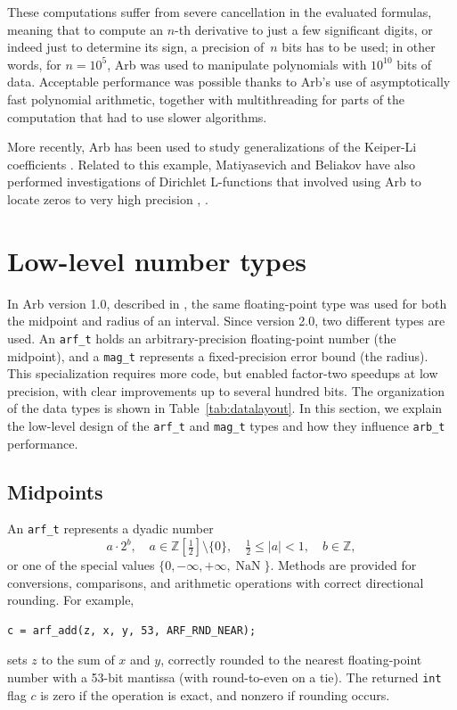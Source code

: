 \documentclass[10pt,journal,compsoc,cspaper]{IEEEtran}
\begin{document}
These computations suffer from severe cancellation in the evaluated formulas,
meaning that to compute an $n$-th derivative to
just a few significant digits, or indeed just to determine its sign,
a precision of~$n$ bits has to be used;
in other words, for $n = 10^5$, Arb was
used to manipulate polynomials with $10^{10}$ bits of data.
Acceptable performance was possible thanks to
Arb's use of asymptotically fast polynomial arithmetic,
together with multithreading for parts of the computation that had
to use slower algorithms.

More recently, Arb has been used to study generalizations
of the Keiper-Li coefficients \cite{bucur2016li}.
Related to this example, Matiyasevich and Beliakov
have also performed investigations of Dirichlet L-functions
that involved using Arb to locate zeros to very high precision
\cite{beliakov2014}, \cite{beliakov2015approximation}.

\section{Low-level number types}
\label{sect:numtypes}

In Arb version 1.0, described in \cite{Johansson2013arb},
the same floating-point type was used for both
the midpoint and radius of an interval.
Since version 2.0, two different types are used.
An \texttt{arf\_t} holds an arbitrary-precision floating-point number (the midpoint),
and a \texttt{mag\_t} represents a fixed-precision error bound (the radius).
This specialization requires more code, but enabled
factor-two speedups
at low precision, with clear improvements
up to several hundred bits.
The organization of the data types is shown in Table~\ref{tab:datalayout}.
In this section, we explain the low-level design of the
\texttt{arf\_t} and \texttt{mag\_t} types
and how they influence \texttt{arb\_t} performance.

\subsection{Midpoints}

An \texttt{arf\_t} represents a dyadic number
$$a \cdot 2^b, \quad a \in \mathbb{Z}[\tfrac{1}{2}] \setminus \{0\}, \quad \tfrac{1}{2} \le |a| < 1, \quad b \in \mathbb{Z},$$
or one of the special values
$\{0, -\infty, +\infty, \operatorname{NaN}\}$.
Methods are provided for conversions, comparisons, and
arithmetic operations with correct directional rounding.
For example,
\begin{verbatim}
c = arf_add(z, x, y, 53, ARF_RND_NEAR);
\end{verbatim}
sets $z$ to the sum of $x$ and $y$, correctly rounded to the nearest
floating-point number with a 53-bit mantissa (with round-to-even on a tie).
The returned \texttt{int} flag $c$ is zero if the operation is exact,
and nonzero if rounding occurs.
\end{document}
